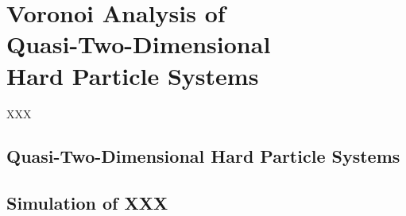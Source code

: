 \chapter[Voronoi Analysis of Quasi\--Two\--Dimensional Hard Particle Systems]{Voronoi Analysis of \\ Quasi\--Two\--Dimensional \\ Hard Particle Systems} 

\begin{chapterabstract}
XXX
\end{chapterabstract}

\section{Quasi\--Two\--Dimensional Hard Particle Systems}

\section{Simulation of XXX}


